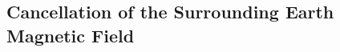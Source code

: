 %

\FloatBarrier

\subsection{Cancellation of the Surrounding Earth Magnetic Field} \label{subsec:earthEli}

